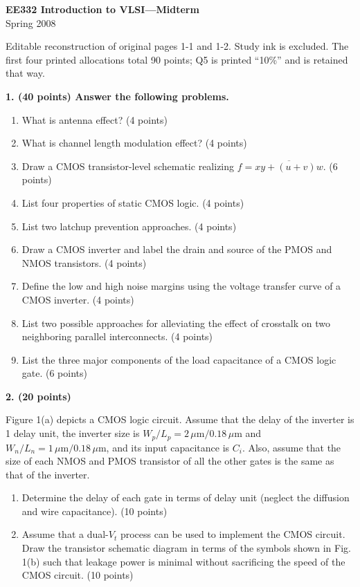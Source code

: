 \documentclass[10pt]{article}
\newcommand{\qheading}[1]{\par\medskip\textbf{#1}\par}
\begin{document}
\begin{center}{\Large\bfseries EE332 Introduction to VLSI---Midterm}\\Spring 2008\end{center}
\small Editable reconstruction of original pages 1-1 and 1-2. Study ink is excluded. The first four printed allocations total 90 points; Q5 is printed ``10\%'' and is retained that way.\normalsize
\qheading{1. (40 points) Answer the following problems.}
\begin{enumerate}[label=(\alph*),leftmargin=7mm]
\item What is antenna effect? (4 points)
\item What is channel length modulation effect? (4 points)
\item Draw a CMOS transistor-level schematic realizing $f=\overline{xy+(u+v)w}$. (6 points)
\item List four properties of static CMOS logic. (4 points)
\item List two latchup prevention approaches. (4 points)
\item Draw a CMOS inverter and label the drain and source of the PMOS and NMOS transistors. (4 points)
\item Define the low and high noise margins using the voltage transfer curve of a CMOS inverter. (4 points)
\item List two possible approaches for alleviating the effect of crosstalk on two neighboring parallel interconnects. (4 points)
\item List the three major components of the load capacitance of a CMOS logic gate. (6 points)
\end{enumerate}
\qheading{2. (20 points)} Figure 1(a) depicts a CMOS logic circuit. Assume that the delay of the inverter is 1 delay unit, the inverter size is $W_p/L_p=2\,\mu\mathrm{m}/0.18\,\mu\mathrm{m}$ and $W_n/L_n=1\,\mu\mathrm{m}/0.18\,\mu\mathrm{m}$, and its input capacitance is $C_i$. Also, assume that the size of each NMOS and PMOS transistor of all the other gates is the same as that of the inverter.
\begin{enumerate}[label=(\alph*),leftmargin=7mm]
\item Determine the delay of each gate in terms of delay unit (neglect the diffusion and wire capacitance). (10 points)
\item Assume that a dual-$V_t$ process can be used to implement the CMOS circuit. Draw the transistor schematic diagram in terms of the symbols shown in Fig. 1(b) such that leakage power is minimal without sacrificing the speed of the CMOS circuit. (10 points)
\end{enumerate}
\end{document}
